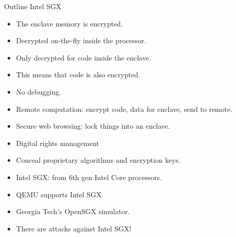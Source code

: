 \begin{frame}
  \begin{block}{Outline Intel SGX}
    \begin{itemize}
      \item The enclave memory is encrypted.
      \item Decrypted on-the-fly inside the processor.
      \item Only decrypted for code inside the enclave.
    \end{itemize}
  \end{block}

  \pause

  \begin{remark}
    \begin{itemize}
      \item This means that code is also encrypted.
      \item No debugging.
    \end{itemize}
  \end{remark}
\end{frame}

\begin{frame}
  \begin{example}[Uses]
    \begin{itemize}
      \item Remote computation: encrypt code, data for enclave, send to remote.
      \item Secure web browsing: lock things into an enclave.
      \item Digital rights management
      \item Conceal proprietary algorithms and encryption keys.
    \end{itemize}
  \end{example}
\end{frame}

\begin{frame}
  \begin{example}[Implementations]
    \begin{itemize}
      \item Intel SGX: from 6th gen Intel Core processors.
      \item QEMU supports Intel SGX.
      \item Georgia Tech's OpenSGX simulator.
    \end{itemize}
  \end{example}
\end{frame}

\begin{frame}
  \begin{remark}
    \begin{itemize}
      \item There are attacks against Intel SGX!
    \end{itemize}
  \end{remark}
\end{frame}

